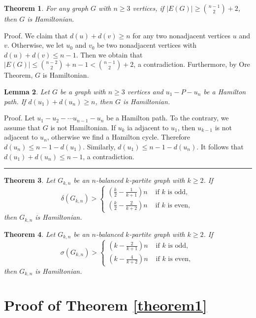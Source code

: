 \documentclass[reqno]{amsart}
\def\q{\hfill\rule{1ex}{1ex}}
\def\q{\hfill\rule{1ex}{1ex}}
\newtheorem{theorem}{Theorem}
\newtheorem{lemma}[theorem]{Lemma}
\begin{document}
\begin{theorem}\label{theorem2} For any graph $G$ with $n \geq 3$ vertices, if $|E(G)| \geq \binom{n-1}{2} + 2$,
then $G$ is Hamiltonian.
\end{theorem}
{\noindent Proof.} We claim that $d(u)+d(v) \geq n$ for any two nonadjacent vertices $u$ and $v$.  Otherwise, we let $u_0$ and $v_0$ be two nonadjacent vertices with $d(u)+d(v) \leq n-1$. Then we obtain that  $|E(G)| \leq \binom{n-2}{2} + n-1 < \binom{n-1}{2} + 2$, a contradiction.  Furthermore, by Ore Theorem,  $G$ is Hamiltonian.

\begin{lemma}\label{lemma1} Let $G$ be a graph with $n \geq 3$ vertices and $u_1-P-u_n$ be a Hamilton path. If $d(u_1)+d(u_n) \geq n$, then $G$ is Hamiltonian.
\end{lemma}
{\noindent Proof.} Let $u_1-u_2-\cdots u_{n-1}-u_n$ be a Hamilton path. To the contrary, we assume that $G$ is not Hamiltonian. If $u_k$ ia adjacent to $u_1$, then $u_{k-1}$ is not adjacent to $u_n$, otherwise we find a Hamilton cycle. Therefore $d(u_n) \leq n-1-d(u_1)$. Similarly,  $d(u_1) \leq n-1-d(u_n)$. It follows that $d(u_1)+d(u_n) \leq  n-1$, a contradiction. \q

\begin{theorem}\label{theorem4} \cite{1995Hamiltonicity} Let $G_{k,n}$ be an $n$-balanced $k$-partite graph with $k \geq 2$. If $$\delta(G_{k,n})>\left\{\begin{array}{ll}
  \left(\frac{k}{2}-\frac{1}{k+1}\right) n & \text { if } k \text { is odd, }  \\
  \left(\frac{k}{2}-\frac{2}{k+2}\right) n & \text { if } k \text { is even, }
 \end{array}\right.$$ then $G_{k,n}$ is Hamiltonian.
\end{theorem}

\begin{theorem}\label{theorem3} \cite{1997Degree} Let $G_{k,n}$ be an $n$-balanced $k$-partite graph with $k \geq 2$. If $$\sigma(G_{k,n})>\left\{\begin{array}{ll}
  \left(k-\frac{2}{k+1}\right) n & \text { if } k \text { is odd, }  \\
  \left(k-\frac{4}{k+2}\right) n & \text { if } k \text { is even, }
 \end{array}\right.$$ then $G_{k,n}$ is Hamiltonian.
\end{theorem}
\section{ Proof of Theorem \ref{theorem1}}
\end{document}
